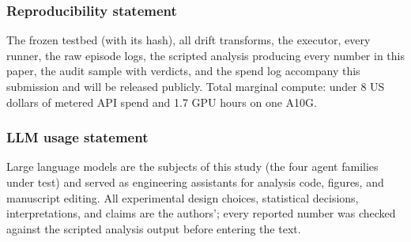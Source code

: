 \subsubsection*{Reproducibility statement}
The frozen testbed (with its hash), all drift transforms, the executor, every runner, the raw episode logs, the scripted analysis producing every number in this paper, the audit sample with verdicts, and the spend log accompany this submission and will be released publicly. Total marginal compute: under 8 US dollars of metered API spend and 1.7 GPU hours on one A10G.

\subsubsection*{LLM usage statement}
Large language models are the subjects of this study (the four agent families under test) and served as engineering assistants for analysis code, figures, and manuscript editing. All experimental design choices, statistical decisions, interpretations, and claims are the authors'; every reported number was checked against the scripted analysis output before entering the text.
